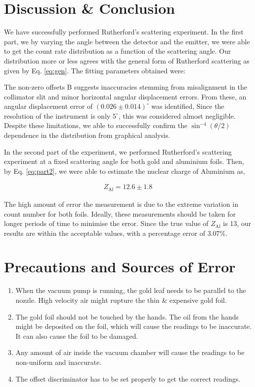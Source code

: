 \section{Discussion \& Conclusion}
We have successfully performed Rutherford's scattering experiment. In the first part, we by varying the angle between the detector and the emitter, we were able to get the count rate distribution as a function of the scattering angle. Our distribution more or less agrees with the general form of Rutherford scattering as given by Eq. \ref{eq:gen}.
The fitting parameters obtained were:


The non-zero offsets B suggests inaccuracies stemming from misalignment in the collimator slit and minor horizontal angular displacement errors. From these, an angular displacement error of $(0.026 \pm 0.014)^\circ$ was identified, Since the resolution of the instrument is only $5^\circ$, this was considered almost negligible. Despite these limitations, we able to successfully confirm the $\sin^{-4}(\theta/2)$ dependence in the distribution from graphical analysis.

In the second part of the experiment, we performed Rutherford’s scattering experiment at a fixed scattering angle for both gold and aluminium foils. Then, by Eq. \ref{eq:part2}, we were able to estimate the nuclear charge of Aluminium as,

\begin{align*}
    \boxed{Z_\text{Al} = 12.6 \pm 1.8}
\end{align*}

The high amount of error the measurement is due to the extreme variation in count number for both foils. Ideally, these measurements should be taken for longer periods of time to minimise the error. Since the true value of $Z_\text{Al}$ is 13, our results are within the acceptable values, with a percentage error of $3.07$\%.

\section{Precautions and Sources of Error}

    \begin{enumerate}
        \item When the vacuum pump is running, the gold leaf
        needs to be parallel to the nozzle. High velocity air
        might rupture the thin \& expensive gold foil.
        \item  The gold foil should not be touched by the hands.
        The oil from the hands might be deposited on the
        foil, which will cause the readings to be inaccurate.
        It can also cause the foil to be damaged.
        \item Any amount of air inside the vacuum chamber will
        cause the readings to be non-uniform and inaccurate.
        \item The offset discriminator has to be set properly to
        get the correct readings.
    \end{enumerate}

